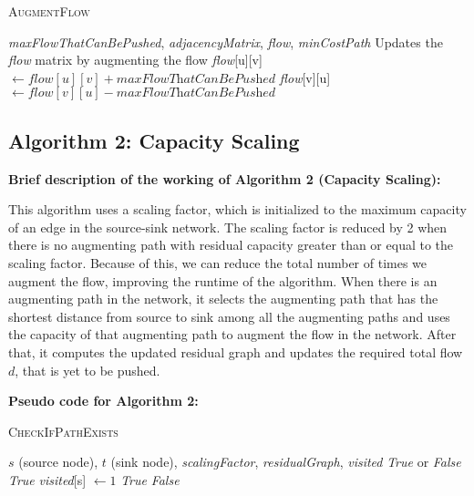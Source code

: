 \documentclass{article}
\begin{document}
\begin{algorithm}[H]
\caption{\textcolor{keywordcolor}{\textsc{AugmentFlow}}}
\begin{algorithmic}[1]
\State {} \textit{maxFlowThatCanBePushed}, \textit{adjacencyMatrix}, \textit{flow}, \textit{minCostPath}
\State {} Updates the \textit{flow} matrix by augmenting the flow
        \State \textit{flow}[u][v] $\gets \textit{flow}[u][v] + \textit{maxFlowThatCanBePushed}$
        \State \textit{flow}[v][u] $\gets \textit{flow}[v][u] - \textit{maxFlowThatCanBePushed}$
    \EndIf
\EndFor
\end{algorithmic}
\end{algorithm}

\subsection{Algorithm 2: Capacity Scaling}

\textbf{Brief description of the working of Algorithm 2 (Capacity Scaling):}

This algorithm uses a scaling factor, which is initialized to the maximum capacity of an edge in the source-sink network. The scaling factor is reduced by 2 when there is no augmenting path with residual capacity greater than or equal to the scaling factor. Because of this, we can reduce the total number of times we augment the flow, improving the runtime of the algorithm. When there is an augmenting path in the network, it selects the augmenting path that has the shortest distance from source to sink among all the augmenting paths and uses the capacity of that augmenting path to augment the flow in the network. After that, it computes the updated residual graph and updates the required total flow \(d\), that is yet to be pushed.

\textbf{Pseudo code for Algorithm 2:}

\begin{algorithm}[H]
\caption{\textcolor{keywordcolor}{\textsc{CheckIfPathExists}}}
\begin{algorithmic}[1]
\State {} $s$ (source node), $t$ (sink node), \textit{scalingFactor}, \textit{residualGraph}, \textit{visited}
\State {} \textit{True} or \textit{False}
    \State \Return \textit{True}
\EndIf
\State \textit{visited}[s] $\gets 1$
            \State \Return \textit{True}
        \EndIf
    \EndIf
\EndFor
\State \Return \textit{False}
\end{algorithmic}
\end{algorithm}
\end{document}
